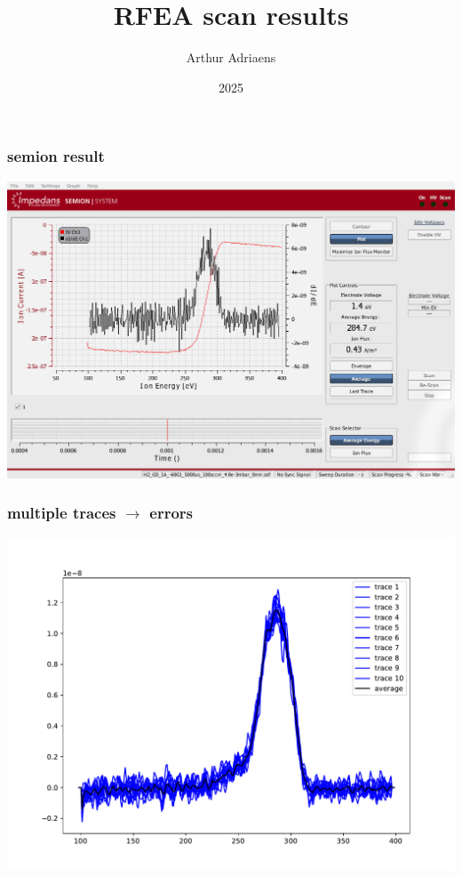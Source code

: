 \documentclass{beamer} %
\title{RFEA scan results} %
\author{Arthur Adriaens}
\date{2025}
\begin{document}
\frame{\titlepage}

\begin{frame}
    \frametitle{semion result}
    \includegraphics[width=\textwidth]{figures/semion.png}
\end{frame}
\begin{frame}
    \frametitle{multiple traces $\rightarrow$ errors}
    \includegraphics[width=\textwidth]{figures/traces.pdf}
\end{frame}
\end{document}
